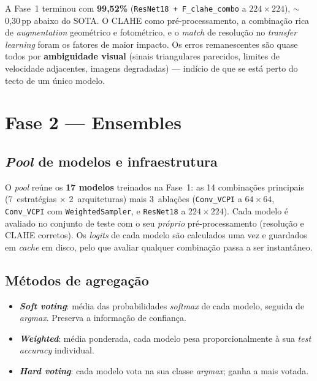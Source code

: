 \documentclass[11pt,a4paper]{article}
\begin{document}
A Fase~1 terminou com \textbf{99{,}52\%} (\texttt{ResNet18 + F\_clahe\_combo} a
$224\times224$), $\sim$0{,}30\,pp abaixo do SOTA. O CLAHE como pré-processamento, a
combinação rica de \emph{augmentation} geométrico e fotométrico, e o \emph{match} de
resolução no \emph{transfer learning} foram os fatores de maior impacto. Os erros
remanescentes são quase todos por \textbf{ambiguidade visual} (sinais triangulares
parecidos, limites de velocidade adjacentes, imagens degradadas) --- indício de que se
está perto do tecto de um único modelo.

\section{Fase 2 --- Ensembles}

\subsection{\emph{Pool} de modelos e infraestrutura}

O \emph{pool} reúne os \textbf{17 modelos} treinados na Fase~1: as 14 combinações
principais (7~estratégias $\times$ 2~arquiteturas) mais 3~ablações
(\texttt{Conv\_VCPI} a $64\times64$, \texttt{Conv\_VCPI} com \texttt{WeightedSampler}, e
\texttt{ResNet18} a $224\times224$). Cada modelo é avaliado no conjunto de teste com o seu
\emph{próprio} pré-processamento (resolução e CLAHE corretos). Os \emph{logits} de cada
modelo são calculados uma vez e guardados em \emph{cache} em disco, pelo que avaliar
qualquer combinação passa a ser instantâneo.

\subsection{Métodos de agregação}

\begin{itemize}[nosep]
  \item \textbf{\emph{Soft voting}}: média das probabilidades \emph{softmax} de cada
  modelo, seguida de \emph{argmax}. Preserva a informação de confiança.
  \item \textbf{\emph{Weighted}}: média ponderada, cada modelo pesa proporcionalmente à
  sua \emph{test accuracy} individual.
  \item \textbf{\emph{Hard voting}}: cada modelo vota na sua classe \emph{argmax}; ganha a
  mais votada.
\end{itemize}
\end{document}
